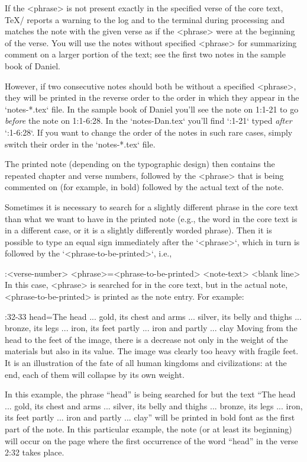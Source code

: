 If the <phrase> is not present exactly in the specified verse of the core text,
\TeX/ reports a warning to the log and to the terminal during processing and
matches the note with the given verse as if the <phrase> were at the beginning of the verse.
You will use the notes without specified <phrase> for summarizing comment on a larger portion of the text; see the first two notes in the sample book of Daniel.

However, if two consecutive notes should both be without a specified <phrase>, they will be printed in the reverse order to the order in which they appear in the `notes-*.tex` file. In the sample book of Daniel you'll see the note on 1:1-21 to go {\it before\/} the note on 1:1-6:28. In the `notes-Dan.tex` you'll find `:1-21` typed {\it after\/} `:1-6:28`. If you want to change the order of the notes in such rare cases, simply switch their order in the `notes-*.tex` file. 

The printed note (depending on the typographic design) then contains
the repeated chapter and verse numbers, followed by the <phrase> that is being commented on (for example, in bold) followed by the actual text of the note.

Sometimes it is necessary to search for a slightly different phrase in the core text than what
we want to have in the printed note (e.g., the word in the core text is in
a different case, or it is a slightly differently worded phrase). Then it is possible to type an equal sign immediately after the `{<phrase>}`, which in turn is followed by the  `{<phrase-to-be-printed>}`, i.e.,

\begtt
{}:<verse-number> {<phrase>}={<phrase-to-be-printed>}
<note-text>
<blank line>
\endtt
In this case, <phrase> is searched for in the core text, but in the actual
note, <phrase-to-be-printed> is printed as the note entry. For example:

\begtt
{}:32-33 {head}={The head ... gold, its chest and arms ... silver, its belly 
   and thighs ... bronze, its legs ... iron, its feet partly ... iron and partly ... clay} 
Moving from the head to the feet of the image, there is a decrease not only in the  weight
of the materials but also in its value. The image was clearly too heavy with fragile feet.
It is an illustration of the fate of all human kingdoms and civilizations:  at the end,
each of them will collapse by its own weight.
\endtt

In this example, the phrase “head” is being searched for but the text “The head ... gold, its chest and arms ... silver, its belly and thighs ... 
bronze, its legs ... iron, its feet partly ... iron and partly ... clay” will be printed in bold font as the first part of the note.
In this particular example, the note (or at least its beginning) will occur on the page where the first occurrence of the word “head” in the verse 2:32 takes place.

